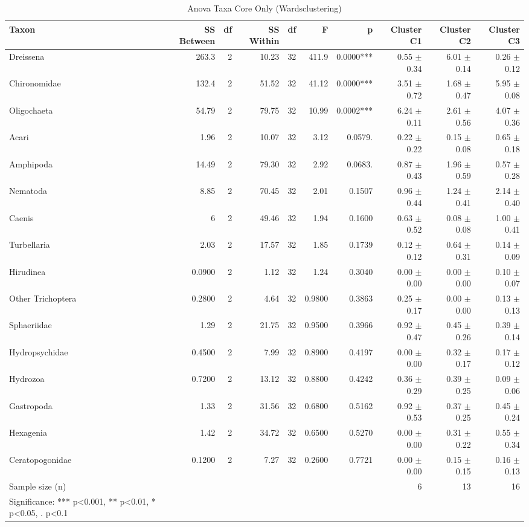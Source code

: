 \begin{table}[htbp]
  \centering
  \caption{Anova Taxa Core Only (Wardsclustering)}
  \label{tab:WardsClustering_tables_anova_taxa_core_only}
  \small
  \begin{tabular}{lrrrrrrrrr}
    \toprule
    Taxon & SS Between & df & SS Within & df  & F & p & Cluster C1 & Cluster C2 & Cluster C3 \\
    \midrule
    Dreissena & 263.3 & 2 & 10.23 & 32 & 411.9 & 0.0000*** & 0.55 $\pm$ 0.34 & 6.01 $\pm$ 0.14 & 0.26 $\pm$ 0.12 \\
    Chironomidae & 132.4 & 2 & 51.52 & 32 & 41.12 & 0.0000*** & 3.51 $\pm$ 0.72 & 1.68 $\pm$ 0.47 & 5.95 $\pm$ 0.08 \\
    Oligochaeta & 54.79 & 2 & 79.75 & 32 & 10.99 & 0.0002*** & 6.24 $\pm$ 0.11 & 2.61 $\pm$ 0.56 & 4.07 $\pm$ 0.36 \\
    Acari & 1.96 & 2 & 10.07 & 32 & 3.12 & 0.0579. & 0.22 $\pm$ 0.22 & 0.15 $\pm$ 0.08 & 0.65 $\pm$ 0.18 \\
    Amphipoda & 14.49 & 2 & 79.30 & 32 & 2.92 & 0.0683. & 0.87 $\pm$ 0.43 & 1.96 $\pm$ 0.59 & 0.57 $\pm$ 0.28 \\
    Nematoda & 8.85 & 2 & 70.45 & 32 & 2.01 & 0.1507 & 0.96 $\pm$ 0.44 & 1.24 $\pm$ 0.41 & 2.14 $\pm$ 0.40 \\
    Caenis & 6 & 2 & 49.46 & 32 & 1.94 & 0.1600 & 0.63 $\pm$ 0.52 & 0.08 $\pm$ 0.08 & 1.00 $\pm$ 0.41 \\
    Turbellaria & 2.03 & 2 & 17.57 & 32 & 1.85 & 0.1739 & 0.12 $\pm$ 0.12 & 0.64 $\pm$ 0.31 & 0.14 $\pm$ 0.09 \\
    Hirudinea & 0.0900 & 2 & 1.12 & 32 & 1.24 & 0.3040 & 0.00 $\pm$ 0.00 & 0.00 $\pm$ 0.00 & 0.10 $\pm$ 0.07 \\
    Other Trichoptera & 0.2800 & 2 & 4.64 & 32 & 0.9800 & 0.3863 & 0.25 $\pm$ 0.17 & 0.00 $\pm$ 0.00 & 0.13 $\pm$ 0.13 \\
    Sphaeriidae & 1.29 & 2 & 21.75 & 32 & 0.9500 & 0.3966 & 0.92 $\pm$ 0.47 & 0.45 $\pm$ 0.26 & 0.39 $\pm$ 0.14 \\
    Hydropsychidae & 0.4500 & 2 & 7.99 & 32 & 0.8900 & 0.4197 & 0.00 $\pm$ 0.00 & 0.32 $\pm$ 0.17 & 0.17 $\pm$ 0.12 \\
    Hydrozoa & 0.7200 & 2 & 13.12 & 32 & 0.8800 & 0.4242 & 0.36 $\pm$ 0.29 & 0.39 $\pm$ 0.25 & 0.09 $\pm$ 0.06 \\
    Gastropoda & 1.33 & 2 & 31.56 & 32 & 0.6800 & 0.5162 & 0.92 $\pm$ 0.53 & 0.37 $\pm$ 0.25 & 0.45 $\pm$ 0.24 \\
    Hexagenia & 1.42 & 2 & 34.72 & 32 & 0.6500 & 0.5270 & 0.00 $\pm$ 0.00 & 0.31 $\pm$ 0.22 & 0.55 $\pm$ 0.34 \\
    Ceratopogonidae & 0.1200 & 2 & 7.27 & 32 & 0.2600 & 0.7721 & 0.00 $\pm$ 0.00 & 0.15 $\pm$ 0.15 & 0.16 $\pm$ 0.13 \\
    Sample size (n) &  &  &  &  &  &  & 6 & 13 & 16 \\
    Significance: *** p<0.001, ** p<0.01, * p<0.05, . p<0.1 &  &  &  &  &  &  &  &  &  \\
    \bottomrule
  \end{tabular}
\end{table}
